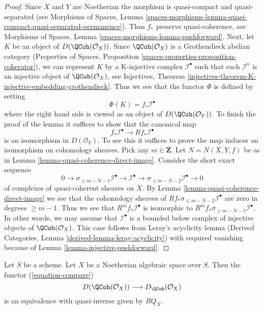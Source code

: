 \begin{proof}
Since $X$ and $Y$ are Noetherian the morphism is quasi-compact
and quasi-separated (see
Morphisms of Spaces, Lemma
\ref{spaces-morphisms-lemma-quasi-compact-quasi-separated-permanence}).
Thus $f_*$ preserve quasi-coherence, see
Morphisms of Spaces, Lemma \ref{spaces-morphisms-lemma-pushforward}.
Next, let $K$ be an object of $D(\QCoh(\mathcal{O}_X))$.
Since $\QCoh(\mathcal{O}_X)$ is a Grothendieck abelian category
(Properties of Spaces, Proposition
\ref{spaces-properties-proposition-coherator}), we can
represent $K$ by a K-injective complex $\mathcal{I}^\bullet$
such that each $\mathcal{I}^n$ is an injective object of
$\QCoh(\mathcal{O}_X)$, see
Injectives, Theorem
\ref{injectives-theorem-K-injective-embedding-grothendieck}.
Thus we see that the functor $\Phi$ is defined by setting
$$
\Phi(K) = f_*\mathcal{I}^\bullet
$$
where the right hand side is viewed as an object of
$D(\QCoh(\mathcal{O}_Y))$. To finish the proof of the lemma
it suffices to show that the canonical map
$$
f_*\mathcal{I}^\bullet \longrightarrow Rf_*\mathcal{I}^\bullet
$$
is an isomorphism in $D(\mathcal{O}_Y)$. To see this it suffices to
prove the map induces an isomorphism on cohomology sheaves. Pick any
$m \in \mathbf{Z}$. Let $N = N(X, Y, f)$ be as in
Lemma \ref{lemma-quasi-coherence-direct-image}.
Consider the short exact sequence
$$
0 \to \sigma_{\geq m - N - 1}\mathcal{I}^\bullet \to
\mathcal{I}^\bullet \to \sigma_{\leq m - N - 2}\mathcal{I}^\bullet \to 0
$$
of complexes of quasi-coherent sheaves on $X$. By
Lemma \ref{lemma-quasi-coherence-direct-image}
we see that the cohomology sheaves of
$Rf_*\sigma_{\leq m - N - 2}\mathcal{I}^\bullet$
are zero in degrees $\geq m - 1$. Thus we see that
$R^mf_*\mathcal{I}^\bullet$ is isomorphic to
$R^mf_*\sigma_{\geq m - N - 1}\mathcal{I}^\bullet$.
In other words, we may assume that $\mathcal{I}^\bullet$
is a bounded below complex of injective objects of
$\QCoh(\mathcal{O}_X)$.
This case follows from Leray's acyclicity lemma
(Derived Categories, Lemma \ref{derived-lemma-leray-acyclicity})
with required vanishing because of Lemma \ref{lemma-injective-pushforward}.
\end{proof}

\begin{proposition}
\label{proposition-Noetherian}
Let $S$ be a scheme. Let $X$ be a Noetherian algebraic space over $S$.
Then the functor (\ref{equation-compare})
$$
D(\QCoh(\mathcal{O}_X))
\longrightarrow
D_\QCoh(\mathcal{O}_X)
$$
is an equivalence with quasi-inverse given by $RQ_X$.
\end{proposition}

